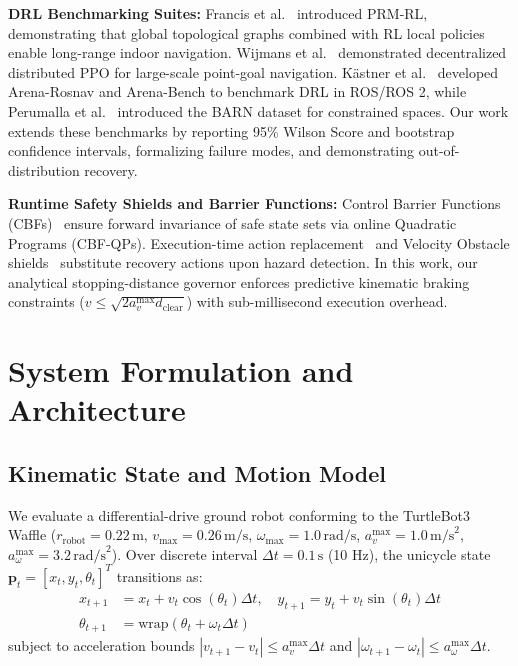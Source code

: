 \documentclass[runningheads]{llncs}
\begin{document}
\textbf{DRL Benchmarking Suites:} Francis et al.~\cite{francis2020prmrl} introduced PRM-RL, demonstrating that global topological graphs combined with RL local policies enable long-range indoor navigation. Wijmans et al.~\cite{wijmans2020ddppo} demonstrated decentralized distributed PPO for large-scale point-goal navigation. Kästner et al.~\cite{kastner2021arena, kastner2022arenabench} developed Arena-Rosnav and Arena-Bench to benchmark DRL in ROS/ROS 2, while Perumalla et al.~\cite{perumalla2020barn} introduced the BARN dataset for constrained spaces. Our work extends these benchmarks by reporting 95\% Wilson Score and bootstrap confidence intervals, formalizing failure modes, and demonstrating out-of-distribution recovery.

\textbf{Runtime Safety Shields and Barrier Functions:} Control Barrier Functions (CBFs)~\cite{ames2019cbf, cheng2019endtoend} ensure forward invariance of safe state sets via online Quadratic Programs (CBF-QPs). Execution-time action replacement~\cite{chiang2021execution} and Velocity Obstacle shields~\cite{kastner2022velocity} substitute recovery actions upon hazard detection. In this work, our analytical stopping-distance governor enforces predictive kinematic braking constraints ($v \le \sqrt{2 a_v^{\max} d_{\text{clear}}}$) with sub-millisecond execution overhead.

\section{System Formulation and Architecture}

\subsection{Kinematic State and Motion Model}
We evaluate a differential-drive ground robot conforming to the TurtleBot3 Waffle ($r_{\text{robot}} = 0.22\,\text{m}$, $v_{\max} = 0.26\,\text{m/s}$, $\omega_{\max} = 1.0\,\text{rad/s}$, $a_v^{\max} = 1.0\,\text{m/s}^2$, $a_\omega^{\max} = 3.2\,\text{rad/s}^2$). Over discrete interval $\Delta t = 0.1\,\text{s}$ (10 Hz), the unicycle state $\mathbf{p}_t = [x_t, y_t, \theta_t]^T$ transitions as:
\begin{align}
x_{t+1} &= x_t + v_t \cos(\theta_t) \Delta t, \quad y_{t+1} = y_t + v_t \sin(\theta_t) \Delta t \\
\theta_{t+1} &= \text{wrap}\left(\theta_t + \omega_t \Delta t\right)
\end{align}
subject to acceleration bounds $|v_{t+1} - v_t| \le a_v^{\max} \Delta t$ and $|\omega_{t+1} - \omega_t| \le a_\omega^{\max} \Delta t$.
\end{document}

